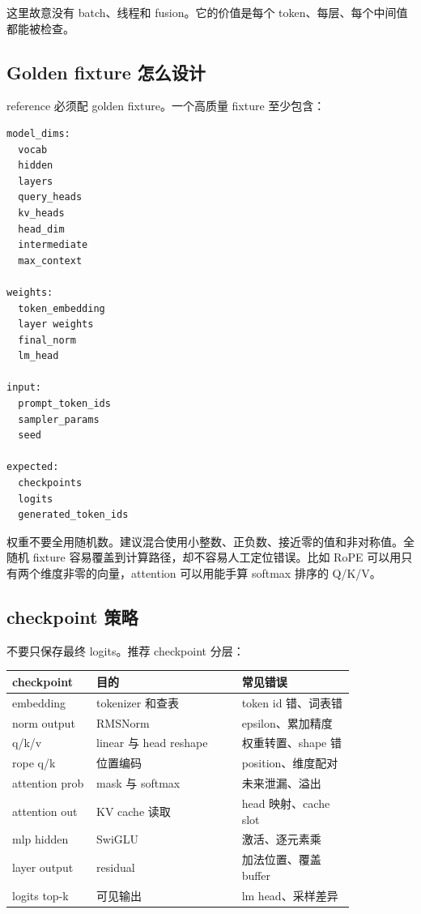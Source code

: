这里故意没有 batch、线程和 fusion。它的价值是每个 token、每层、每个中间值都能被检查。

\subsection{Golden fixture 怎么设计}

reference 必须配 golden fixture。一个高质量 fixture 至少包含：

\begin{lstlisting}[numbers=none,caption={tiny decoder fixture 内容}]
model_dims:
  vocab
  hidden
  layers
  query_heads
  kv_heads
  head_dim
  intermediate
  max_context

weights:
  token_embedding
  layer weights
  final_norm
  lm_head

input:
  prompt_token_ids
  sampler_params
  seed

expected:
  checkpoints
  logits
  generated_token_ids
\end{lstlisting}

权重不要全用随机数。建议混合使用小整数、正负数、接近零的值和非对称值。全随机 fixture 容易覆盖到计算路径，却不容易人工定位错误。比如 RoPE 可以用只有两个维度非零的向量，attention 可以用能手算 softmax 排序的 Q/K/V。

\subsection{checkpoint 策略}

不要只保存最终 logits。推荐 checkpoint 分层：

\begin{center}
\begin{tabular}{p{0.20\linewidth}p{0.36\linewidth}p{0.28\linewidth}}
\toprule
checkpoint & 目的 & 常见错误 \\
\midrule
embedding & tokenizer 和查表 & token id 错、词表错 \\
norm output & RMSNorm & epsilon、累加精度 \\
q/k/v & linear 与 head reshape & 权重转置、shape 错 \\
rope q/k & 位置编码 & position、维度配对 \\
attention prob & mask 与 softmax & 未来泄漏、溢出 \\
attention out & KV cache 读取 & head 映射、cache slot \\
mlp hidden & SwiGLU & 激活、逐元素乘 \\
layer output & residual & 加法位置、覆盖 buffer \\
logits top-k & 可见输出 & lm head、采样差异 \\
\bottomrule
\end{tabular}
\end{center}

